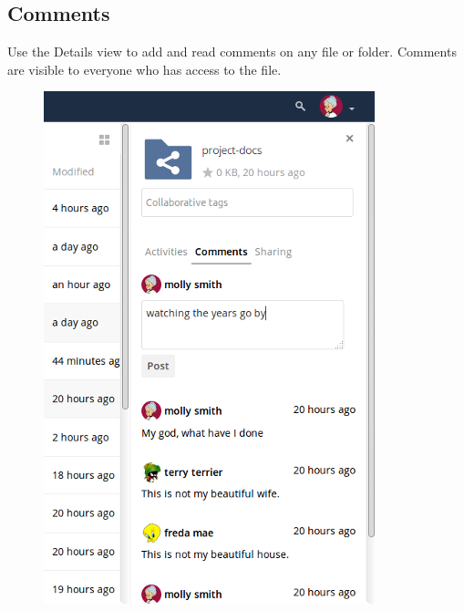 \documentclass[letterpaper,10pt,english]{sphinxmanual}
\begin{document}
\subsection{Comments}
\label{files/access_webgui:comments}
Use the Details view to add and read comments on any file or folder. Comments
are visible to everyone who has access to the file.
\begin{figure}[htbp]
\centering

\includegraphics{file_menu_comments_2.png}
\end{figure}
\end{document}
